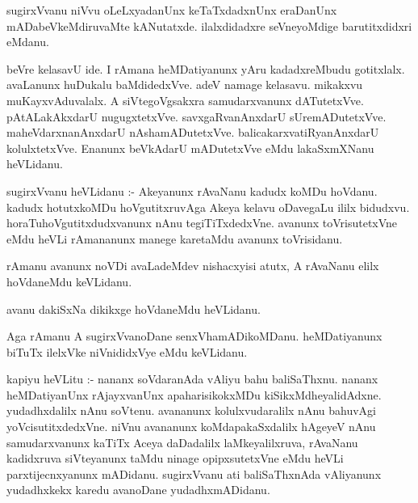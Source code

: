 \documentclass{article}
\begin{document}
\begin{mn}
sugirxVvanu  niVvu  oLeLxyadanUnx  keTaTxdadxnUnx  eraDanUnx  mADabeVkeMdiruvaMte  kANutatxde.  ilalxdidadxre  seVneyoMdige  
barutitxdidxri  eMdanu.
\end{mn}

\begin{mn}
beVre  kelasavU  ide.  I  rAmana  heMDatiyanunx  yAru  kadadxreMbudu  gotitxlalx.  avaLanunx  huDukalu  baMdidedxVve.  adeV  
namage  kelasavu.  mikakxvu  muKayxvAduvalalx.  A  siVtegoVgsakxra  samudarxvanunx  dATutetxVve.  pAtALakAkxdarU  nugugxtetxVve.  
savxgaRvanAnxdarU  sUremADutetxVve.  maheVdarxnanAnxdarU  nAshamADutetxVve.  balicakarxvatiRyanAnxdarU  kolulxtetxVve.  Enanunx 
 beVkAdarU  mADutetxVve  eMdu  lakaSxmXNanu  heVLidanu.  
\end{mn}

\begin{mn}
sugirxVvanu  heVLidanu :- Akeyanunx  rAvaNanu  kadudx koMDu hoVdanu.  kadudx  hotutxkoMDu  hoVgutitxruvAga  Akeya  kelavu  
oDavegaLu  ililx  bidudxvu.  horaTuhoVgutitxdudxvanunx  nAnu  tegiTiTxdedxVne.  avanunx  toVrisutetxVne  eMdu  heVLi  rAmananunx  
manege  karetaMdu  avanunx  toVrisidanu.
\end{mn}

\begin{mn}
rAmanu  avanunx  noVDi  avaLadeMdev  nishacxyisi  atutx,  A  rAvaNanu  elilx  hoVdaneMdu  keVLidanu.
\end{mn}

\begin{mn}
avanu  dakiSxNa  dikikxge  hoVdaneMdu  heVLidanu.
\end{mn}

\begin{mn}
Aga  rAmanu  A  sugirxVvanoDane  senxVhamADikoMDanu.  heMDatiyanunx  biTuTx  ilelxVke  niVnididxVye  eMdu  keVLidanu. 
\end{mn}

\begin{mn}
kapiyu  heVLitu :- nananx  soVdaranAda  vAliyu  bahu  baliSaThxnu.  nananx  heMDatiyanUnx  rAjayxvanUnx  apaharisikokxMDu  
kiSikxMdheyalidAdxne.  yudadhxdalilx  nAnu  soVtenu.  avananunx  kolulxvudaralilx  nAnu  bahuvAgi  yoVcisutitxdedxVne.  
niVnu  avananunx  koMdapakaSxdalilx  hAgeyeV  nAnu  samudarxvanunx  kaTiTx  Aceya  daDadalilx  laMkeyalilxruva,  rAvaNanu  
kadidxruva  siVteyanunx  taMdu  ninage  opipxsutetxVne  eMdu  heVLi  parxtijecnxyanunx  mADidanu.  sugirxVvanu  ati  
baliSaThxnAda  vAliyanunx  yudadhxkekx  karedu  avanoDane  yudadhxmADidanu.
\end{mn}
\end{document}
